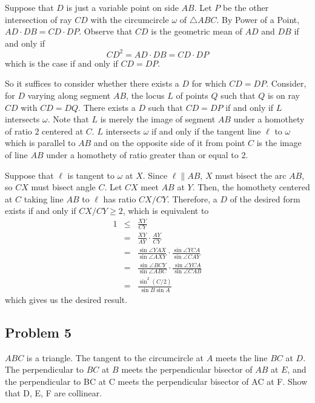 \begin{mdsoln}
    Suppose that $D$ is just a variable point on side $AB$. Let $P$ be the other intersection of ray $CD$ with the circumcircle $\omega$ of $\triangle ABC$. By Power of a Point, $AD\cdot DB=CD\cdot DP$. Observe that $CD$ is the geometric mean of $AD$ and $DB$ if and only if$$CD^2=AD\cdot DB=CD\cdot DP$$which is the case if and only if $CD=DP$.

    So it suffices to consider whether there exists a $D$ for which $CD=DP$. Consider, for $D$ varying along segment $AB$, the locus $L$ of points $Q$ such that $Q$ is on ray $CD$ with $CD=DQ$. There exists a $D$ such that $CD=DP$ if and only if $L$ intersects $\omega$. Note that $L$ is merely the image of segment $AB$ under a homothety of ratio 2 centered at $C$. $L$ intersects $\omega$ if and only if the tangent line $\ell$ to $\omega$ which is parallel to $AB$ and on the opposite side of it from point $C$ is the image of line $AB$ under a homothety of ratio greater than or equal to 2.
    
    Suppose that $\ell$ is tangent to $\omega$ at $X$. Since $\ell\parallel AB$, $X$ must bisect the arc $AB$, so $CX$ must bisect angle $C$. Let $CX$ meet $AB$ at $Y$. Then, the homothety centered at $C$ taking line $AB$ to $\ell$ has ratio $CX/CY$. Therefore, a $D$ of the desired form exists if and only if $CX/CY\ge 2$, which is equivalent to\begin{eqnarray*}1&\le & \frac{XY}{CY}\\ &=&\frac{XY}{AY}\cdot \frac{AY}{CY}\\ &=&\frac{\sin \angle YAX}{\sin \angle AXY}\cdot \frac{\sin \angle YCA}{\sin \angle CAY}\\ &=&\frac{\sin \angle BCY}{\sin \angle ABC}\cdot \frac{\sin \angle YCA}{\sin \angle CAB}\\ &=&\frac{\sin^2 (C/2)}{\sin B\sin A}\end{eqnarray*}which gives us the desired result.        
\end{mdsoln}





\subsection{Problem 5}
$ABC$ is a triangle. The tangent to the circumcircle at $A$ meets the line $BC$ at $D$. The perpendicular to $BC$ at $B$ meets the perpendicular bisector of $AB$ at $E$, and the perpendicular to BC at C meets the perpendicular bisector of AC at F. Show that D, E, F are collinear.

